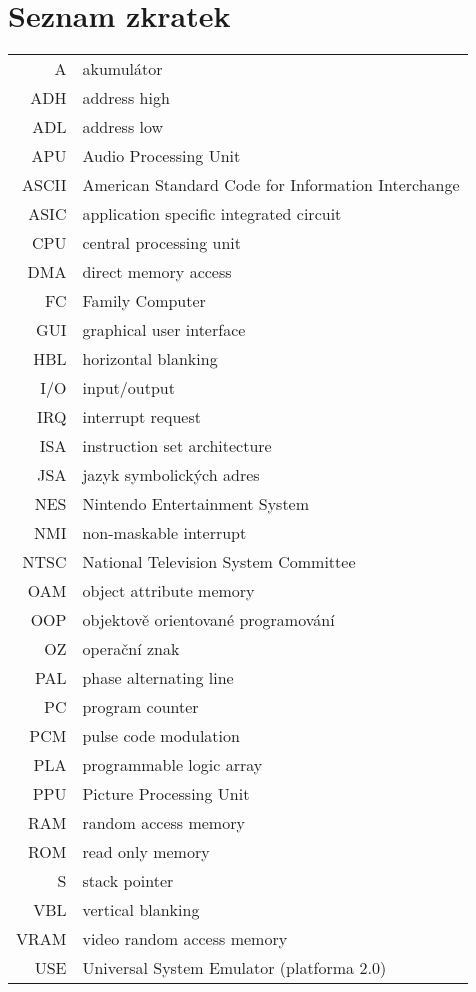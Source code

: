 \documentclass[czech,bachelor,unicode]{ctufit-thesis}
\theoremstyle{plain}
\theoremstyle{definition}
\theoremstyle{remark}
\numberwithin{theorem}{chapter}
\begin{document}
\chapter{Seznam zkratek}
\begin{tabular}{rl}
A 	 & akumulátor \\
ADH &	 address high \\
ADL &	 address low \\
APU &	 Audio Processing Unit\\
ASCII & American Standard Code for Information Interchange \\
ASIC &	 application specific integrated circuit \\
CPU &	 central processing unit\\
DMA & direct memory access \\
FC &	 Family Computer\\
GUI &	 graphical user interface \\
HBL & horizontal blanking \\
I/O &	 input/output \\
IRQ &	 interrupt request\\
ISA &	 instruction set architecture\\
JSA &	 jazyk symbolických adres\\
NES &	 Nintendo Entertainment System\\
NMI &	 non-maskable interrupt\\
NTSC &	 National Television System Committee\\
OAM &	 object attribute memory\\
OOP &	 objektově orientované programování \\
OZ &	 operační znak \\
PAL &	 phase alternating line\\
PC &	 program counter \\
PCM &    pulse code modulation \\
PLA &	 programmable logic array \\
PPU &	 Picture Processing Unit\\
RAM &	 random access memory\\
ROM &	 read only memory\\
S &	 stack pointer \\
VBL & vertical blanking \\
VRAM &	 video random access memory \\
USE & Universal System Emulator (platforma 2.0) \\

\end{tabular}
\end{document}
